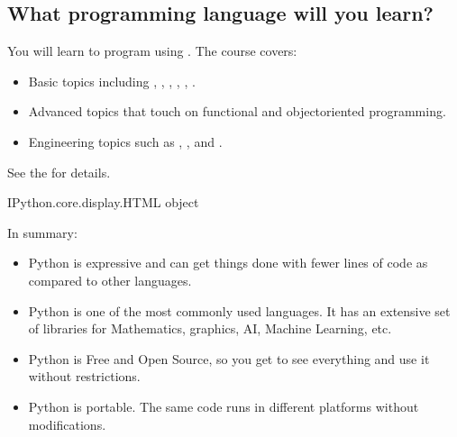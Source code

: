 \documentclass[letterpaper,10pt,english]{sphinxmanual}
\begin{document}
\subsection{What programming language will you learn?}
\label{\detokenize{Lecture1/Introduction to Computer Programming:what-programming-language-will-you-learn}}
You will learn to program using . The course covers:
\begin{itemize}
\item {} 
Basic topics including , , , , , .

\item {} 
Advanced topics that touch on functional and object\sphinxhyphen{}oriented programming.

\item {} 
Engineering topics such as , , and .

\end{itemize}

See the  for details.


\begin{sphinxVerbatim}[commandchars=\\\{\}]
    
\end{sphinxVerbatim}

\begin{sphinxVerbatim}[commandchars=\\\{\}]
\PYGZlt{}IPython.core.display.HTML object\PYGZgt{}
\end{sphinxVerbatim}

In summary:
\begin{itemize}
\item {} 
Python is expressive and can get things done with fewer lines of code as compared to other languages.

\item {} 
Python is one of the most commonly used languages. It has an extensive set of libraries for Mathematics, graphics, AI, Machine Learning, etc.

\item {} 
Python is Free and Open Source, so you get to see everything and use it without restrictions.

\item {} 
Python is portable. The same code runs in different platforms without modifications.

\end{itemize}
\end{document}
